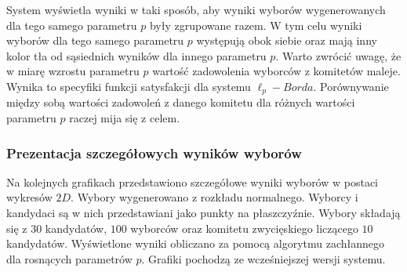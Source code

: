 \documentclass[polish,11pt]{aghthesis}
\begin{document}
\noindent System wyświetla wyniki w taki sposób, aby wyniki wyborów wygenerowanych dla tego samego parametru $p$ były zgrupowane razem. W tym celu wyniki wyborów dla tego samego parametru $p$ występują obok siebie oraz mają inny kolor tła od sąsiednich wyników dla innego parametru $p$. Warto zwrócić uwagę, że w miarę wzrostu parametru $p$ wartość zadowolenia wyborców z komitetów maleje. Wynika to specyfiki funkcji satysfakcji dla systemu $\ell_p-Borda$. Porównywanie między sobą wartości zadowoleń z danego komitetu dla różnych wartości parametru $p$ raczej mija się z celem.  

\newpage
\subsubsection{Prezentacja szczegółowych wyników wyborów}
Na kolejnych grafikach przedstawiono szczegółowe wyniki wyborów w postaci wykresów $2D$. Wybory wygenerowano z rozkładu
normalnego. Wyborcy i kandydaci są w nich przedstawiani jako punkty na płaszczyźnie. Wybory składają się z $30$ kandydatów, $100$ wyborców oraz komitetu zwycięskiego liczącego $10$ kandydatów. Wyświetlone wyniki obliczano za pomocą algorytmu zachłannego dla rosnących parametrów $p$. Grafiki pochodzą ze wcześniejszej wersji systemu.
\end{document}
